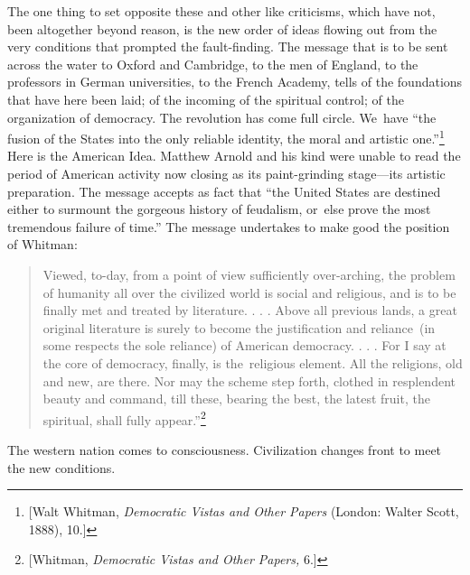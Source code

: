 \documentclass[openany,nobib]{tufte-book}
\begin{document}
The one thing to set opposite these and other like criticisms, which
have not, been altogether beyond reason, is the new order of ideas
flowing out from the very conditions that prompted the fault-finding.
The message that is to be sent across the water to Oxford and Cambridge,
to the men of England, to the professors in German universities, to the
French Academy, tells of the foundations that have here been laid; of
the incoming of the spiritual control; of the organization of democracy.
The revolution has come full circle. We~have ``the fusion of the States
into the only reliable identity, the moral and artistic
one.''\footnote{{[}Walt Whitman, \emph{Democratic Vistas and Other
  Papers} (London: Walter Scott, 1888), 10.{]}} Here is the American
Idea. Matthew Arnold and his kind were unable to read the period of
American activity now closing as its paint-grinding stage---its artistic
preparation. The message accepts as fact that ``the United States are
destined either to surmount the gorgeous history of feudalism, or~else
prove the most tremendous failure of time.'' The message undertakes to
make good the position of Whitman:

\begin{quote}
Viewed, to-day, from a point of view sufficiently over-arching, the
problem of humanity all over the civilized world is social and
religious, and is to be finally met and treated by literature. . . .
Above all previous lands, a great original literature is surely to
become the justification and reliance~(in some respects the sole
reliance) of American democracy. . . . For I say at the core of
democracy, finally, is the~religious element. All the religions, old and
new, are there. Nor may the scheme step forth, clothed in resplendent
beauty and command, till these, bearing the best, the latest fruit, the
spiritual, shall fully appear.''\footnote{{[}Whitman, \emph{Democratic
  Vistas and Other Papers,} 6.{]}}
\end{quote}

The western nation comes to consciousness. Civilization changes front to
meet the new conditions.~
\end{document}
